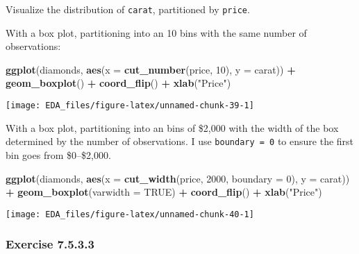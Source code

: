 \documentclass[]{book}
\newenvironment{Shaded}{\begin{snugshade}}{\end{snugshade}}
\newcommand{\DataTypeTok}[1]{\textcolor[rgb]{0.13,0.29,0.53}{#1}}
\newcommand{\DecValTok}[1]{\textcolor[rgb]{0.00,0.00,0.81}{#1}}
\newcommand{\KeywordTok}[1]{\textcolor[rgb]{0.13,0.29,0.53}{\textbf{#1}}}
\newcommand{\NormalTok}[1]{#1}
\newcommand{\OperatorTok}[1]{\textcolor[rgb]{0.81,0.36,0.00}{\textbf{#1}}}
\newcommand{\OtherTok}[1]{\textcolor[rgb]{0.56,0.35,0.01}{#1}}
\newcommand{\StringTok}[1]{\textcolor[rgb]{0.31,0.60,0.02}{#1}}
\theoremstyle{plain}
\theoremstyle{remark}
\begin{document}
Visualize the distribution of \texttt{carat}, partitioned by
\texttt{price}.

With a box plot, partitioning into an 10 bins with the same number of
observations:

\begin{Shaded}
\begin{Highlighting}[]
\KeywordTok{ggplot}\NormalTok{(diamonds, }\KeywordTok{aes}\NormalTok{(}\DataTypeTok{x =} \KeywordTok{cut_number}\NormalTok{(price, }\DecValTok{10}\NormalTok{), }\DataTypeTok{y =}\NormalTok{ carat)) }\OperatorTok{+}
\StringTok{  }\KeywordTok{geom_boxplot}\NormalTok{() }\OperatorTok{+}
\StringTok{  }\KeywordTok{coord_flip}\NormalTok{() }\OperatorTok{+}
\StringTok{  }\KeywordTok{xlab}\NormalTok{(}\StringTok{"Price"}\NormalTok{)}
\end{Highlighting}
\end{Shaded}

\begin{center}\texttt{[image: EDA\_files/figure-latex/unnamed-chunk-39-1]} \end{center}

With a box plot, partitioning into an bins of \$2,000 with the width of
the box determined by the number of observations. I use
\texttt{boundary\ =\ 0} to ensure the first bin goes from \$0--\$2,000.

\begin{Shaded}
\begin{Highlighting}[]
\KeywordTok{ggplot}\NormalTok{(diamonds, }\KeywordTok{aes}\NormalTok{(}\DataTypeTok{x =} \KeywordTok{cut_width}\NormalTok{(price, }\DecValTok{2000}\NormalTok{, }\DataTypeTok{boundary =} \DecValTok{0}\NormalTok{), }\DataTypeTok{y =}\NormalTok{ carat)) }\OperatorTok{+}
\StringTok{  }\KeywordTok{geom_boxplot}\NormalTok{(}\DataTypeTok{varwidth =} \OtherTok{TRUE}\NormalTok{) }\OperatorTok{+}
\StringTok{  }\KeywordTok{coord_flip}\NormalTok{() }\OperatorTok{+}
\StringTok{  }\KeywordTok{xlab}\NormalTok{(}\StringTok{"Price"}\NormalTok{)}
\end{Highlighting}
\end{Shaded}

\begin{center}\texttt{[image: EDA\_files/figure-latex/unnamed-chunk-40-1]} \end{center}

\hypertarget{exercise-7.5.3.3}{%
\subsubsection*{\texorpdfstring{Exercise
{7.5.3.3}}{Exercise 7.5.3.3}}\label{exercise-7.5.3.3}}
\end{document}

